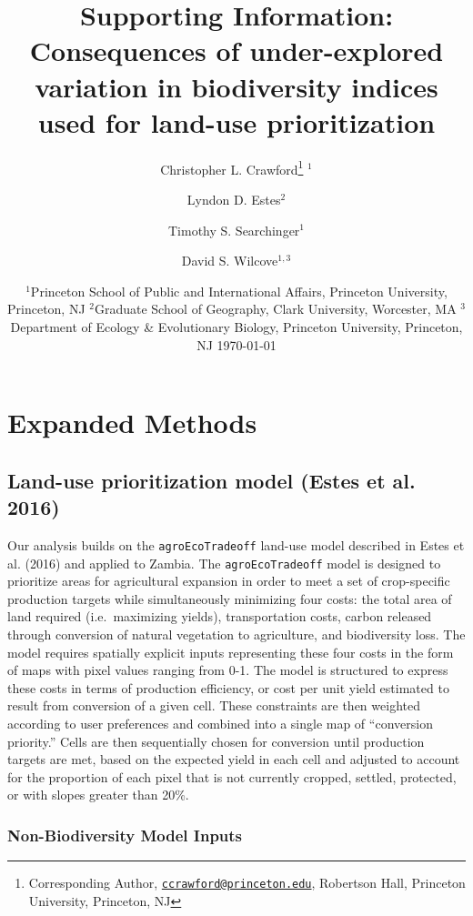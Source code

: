 \documentclass[
]{article}
\title{Supporting Information: Consequences of under-explored variation in biodiversity indices used for land-use prioritization}
\author{Christopher L. Crawford\footnote{Corresponding Author, \href{mailto:ccrawford@princeton.edu}{\nolinkurl{ccrawford@princeton.edu}}, Robertson Hall, Princeton University, Princeton, NJ} \(^1\) \and Lyndon D. Estes\(^2\) \and Timothy S. Searchinger\(^1\) \and David S. Wilcove\(^{1, 3}\)}
\date{\(^1\)Princeton School of Public and International Affairs, Princeton University, Princeton, NJ \newline \(^2\)Graduate School of Geography, Clark University, Worcester, MA \newline \(^3\)Department of Ecology \& Evolutionary Biology, Princeton University, Princeton, NJ \newline \newline \newline \today}
\begin{document}
\maketitle

{
\setcounter{tocdepth}{2}
\tableofcontents
}
\listoffigures

\hypertarget{expanded-methods}{%
\section{Expanded Methods}\label{expanded-methods}}

\hypertarget{land-use-prioritization-model-estes2016a}{%
\subsection{Land-use prioritization model (Estes et al. 2016)}\label{land-use-prioritization-model-estes2016a}}

Our analysis builds on the \texttt{agroEcoTradeoff} land-use model described in Estes et al. (2016) and applied to Zambia. The \texttt{agroEcoTradeoff} model is designed to prioritize areas for agricultural expansion in order to meet a set of crop-specific production targets while simultaneously minimizing four costs: the total area of land required (i.e.~maximizing yields), transportation costs, carbon released through conversion of natural vegetation to agriculture, and biodiversity loss. The model requires spatially explicit inputs representing these four costs in the form of maps with pixel values ranging from 0-1. The model is structured to express these costs in terms of production efficiency, or cost per unit yield estimated to result from conversion of a given cell. These constraints are then weighted according to user preferences and combined into a single map of ``conversion priority.'' Cells are then sequentially chosen for conversion until production targets are met, based on the expected yield in each cell and adjusted to account for the proportion of each pixel that is not currently cropped, settled, protected, or with slopes greater than 20\%.

\hypertarget{non-bd-inputs}{%
\subsubsection{Non-Biodiversity Model Inputs}\label{non-bd-inputs}}
\end{document}
